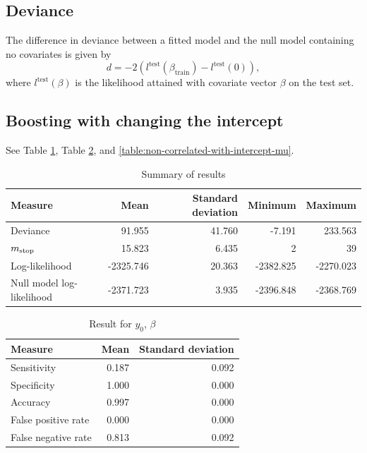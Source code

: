 \subsection{Deviance}
The difference in deviance between a fitted model and the null model containing no covariates is given by
\begin{equation*}
    d=-2\left(l^{\text{test}}(\beta_{\text{train}})-l^{\text{test}}(0)\right),
\end{equation*}
where $l^{\text{test}}(\beta)$ is the likelihood attained with covariate vector $\beta$ on the test set.

\subsection{Boosting with changing the intercept}
See Table \ref{table:non-correlated-with-intercept-summary}, Table \ref{table:non-correlated-with-intercept-y0}, and \ref{table:non-correlated-with-intercept-mu}.
\begin{table}\caption{Summary of results}\label{table:non-correlated-with-intercept-summary}
\begin{tabular}{l|rrrr}
Measure &   Mean & Standard deviation &  Minimum &    Maximum \\
\hline
Deviance    &    91.955 & 41.760 &    -7.191 &   233.563 \\
$m_{\text{stop}}$      &    15.823 &  6.435 &     2 &    39 \\
Log-likelihood      & -2325.746 & 20.363 & -2382.825 & -2270.023 \\
Null model log-likelihood & -2371.723 &  3.935 & -2396.848 & -2368.769
\end{tabular}
\end{table}

\begin{table}\caption{Result for $y_0$, $\beta$}\label{table:non-correlated-with-intercept-y0}
\begin{tabular}{l|rr}
Measure &  Mean &    Standard deviation \\
\hline
Sensitivity & 0.187 & 0.092 \\
Specificity & 1.000 & 0.000 \\
Accuracy    & 0.997 & 0.000 \\
False positive rate & 0.000 & 0.000 \\
False negative rate & 0.813 & 0.092
\end{tabular}
\end{table}


